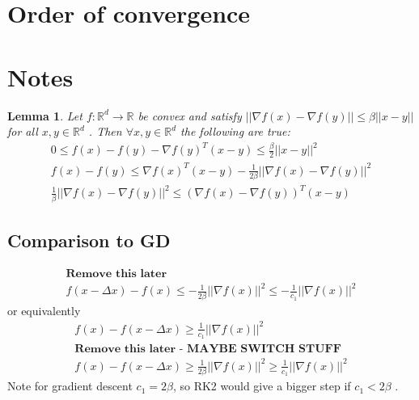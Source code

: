 \documentclass[12pt,twoside]{article}
\newtheorem{lemma}{Lemma}
\begin{document}
\section{Order of convergence}


\section{Notes}
\begin{lemma}
Let $f : \mathbb{R}^d \rightarrow \mathbb{R}$  be convex and satisfy $|| \nabla f(x) - \nabla f(y) || \leq \beta || x -y ||$ for all $x,y \in \mathbb{R}^d$ . Then $\forall x,y \in \mathbb{R}^d$ the following are true:
\begin{align}
0 \leq f(x) - f(y) - \nabla f(y)^T (x-y) \leq \frac{\beta}{2} || x-y ||^2 \\
f(x) - f(y) \leq \nabla f(x)^T (x-y) - \frac{1}{2 \beta} || \nabla f(x) - \nabla f(y) ||^2 \\
\frac{1}{\beta} || \nabla f(x) - \nabla f(y) ||^2  \leq( \nabla f(x) - \nabla f(y))^T(x-y)
\end{align} 
\end{lemma}
\subsection{Comparison to GD}
\begin{align}
\textbf{Remove this later} \\
f(x - \Delta x ) - f(x) \leq - \frac{1}{2\beta}  || \nabla f(x) ||^2 \leq - \frac{1}{c_1} || \nabla f(x) ||^2 
\end{align}
or equivalently 
\begin{align*}
f(x  ) - f(x - \Delta x) \geq  \frac{1}{c_1} || \nabla f(x) ||^2 \\
\textbf{Remove this later - MAYBE SWITCH STUFF } \\
f(x  ) - f(x - \Delta x) \geq  \frac{1}{2\beta} || \nabla f(x) ||^2 \geq  \frac{1}{c_1}  || \nabla f(x) ||^2
\end{align*}
Note for gradient descent $c_1 = 2\beta$, so RK2 would give a bigger step if $c_1 < 2\beta$ . 
\end{document}
